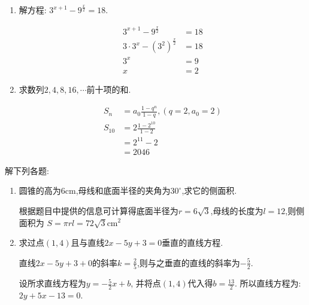 \begin{questions}
	\begin{enumerate}[label=(\arabic*)]
		\item 解方程: $3^{x+1} - 9^{\frac{x}{2}} = 18$.
		      \begin{solution}
			      \begin{align*}
				      3^{x+1} - 9^{\frac{x}{2}}        & = 18 \\
				      3\cdot 3^x - (3^2)^{\frac{x}{2}} & = 18 \\
				      3^x                              & = 9  \\
				      x                                & = 2
			      \end{align*}
		      \end{solution}
		\item 求数列$2,4,8,16,\cdots $前十项的和.
		      \begin{solution}
			      \begin{align*}
				      S_n    & = a_0\frac{1-q^n}{1-q}, (q=2, a_0=2) \\
				      S_{10} & = 2\frac{1-2^{10}}{1-2}              \\
				             & = 2^{11} - 2                         \\
				             & = 2046
			      \end{align*}
		      \end{solution}
	\end{enumerate}

	\question 解下列各题:
	\begin{enumerate}[label=(\arabic*)]
		\item 圆锥的高为$6$cm,母线和底面半径的夹角为$30^\circ$,求它的侧面积.
		      \begin{solution}
			      根据题目中提供的信息可计算得底面半径为$r = 6\sqrt{3}$,母线的长度为$l = 12$,则侧面积为
			      \begin{math}
				      S = \pi r l = 72\sqrt{3} \text{cm}^2
			      \end{math}
		      \end{solution}
		\item 求过点$(1,4)$且与直线$2x - 5y + 3 = 0$垂直的直线方程.
		      \begin{solution}
			      直线$2x - 5y + 3 + 0$的斜率$k=\frac25$,则与之垂直的直线的斜率为$-\frac52$.

			      设所求直线方程为$y =
				      -\frac52x+b$, 并将点$(1,4)$代入得$b = \frac{13}{2}$.
			      所以直线方程为:$2y + 5x - 13 = 0$.
		      \end{solution}
	\end{enumerate}


\end{questions}
